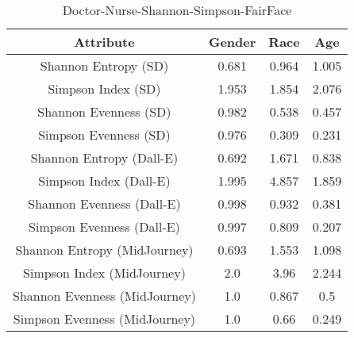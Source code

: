 \begin{table}[h]
\centering
\begin{tabular}{|c|c|c|c|}
\hline 
Attribute & Gender & Race & Age\\
\hline
Shannon Entropy (SD) & 0.681  &  0.964  &  1.005 \\
Simpson Index (SD) & 1.953  &  1.854  &  2.076 \\
Shannon Evenness (SD) & 0.982  &  0.538  &  0.457 \\
Simpson Evenness (SD) & 0.976  &  0.309  &  0.231 \\
\hline
Shannon Entropy (Dall-E) & 0.692  &  1.671  &  0.838 \\
Simpson Index (Dall-E) & 1.995  &  4.857  &  1.859 \\
Shannon Evenness (Dall-E) & 0.998  &  0.932  &  0.381 \\
Simpson Evenness (Dall-E) & 0.997  &  0.809  &  0.207 \\
\hline
Shannon Entropy (MidJourney) & 0.693  &  1.553  &  1.098 \\
Simpson Index (MidJourney) & 2.0  &  3.96  &  2.244 \\
Shannon Evenness (MidJourney) & 1.0  &  0.867  &  0.5 \\
Simpson Evenness (MidJourney) & 1.0  &  0.66  &  0.249 \\
\hline
\end{tabular}
\caption{Doctor-Nurse-Shannon-Simpson-FairFace}
\label{tab:doctor-nurse-shannon-simpson-fairFace}
\end{table}

